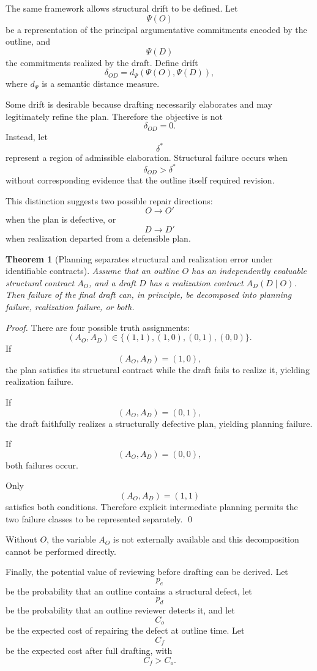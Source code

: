\documentclass[11pt]{article}
\newtheorem{theorem}[definition]{Theorem}
\begin{document}
The same framework allows structural drift to be defined. Let
\[
    \Psi(O)
\]
be a representation of the principal argumentative commitments encoded by the outline, and
\[
    \Psi(D)
\]
the commitments realized by the draft. Define drift
\[
    \delta_{OD}
    =
    d_\Psi(\Psi(O),\Psi(D)),
\]
where \(d_\Psi\) is a semantic distance measure.

Some drift is desirable because drafting necessarily elaborates and may legitimately refine the plan. Therefore the objective is not
\[
    \delta_{OD}=0.
\]
Instead, let
\[
    \delta^\ast
\]
represent a region of admissible elaboration. Structural failure occurs when
\[
    \delta_{OD}>\delta^\ast
\]
without corresponding evidence that the outline itself required revision.

This distinction suggests two possible repair directions:
\[
    O\rightarrow O'
\]
when the plan is defective, or
\[
    D\rightarrow D'
\]
when realization departed from a defensible plan.

\begin{theorem}[Planning separates structural and realization error under identifiable contracts]
Assume that an outline \(O\) has an independently evaluable structural contract \(A_O\), and a draft \(D\) has a realization contract \(A_D(D\mid O)\). Then failure of the final draft can, in principle, be decomposed into planning failure, realization failure, or both.
\end{theorem}

\begin{proof}
There are four possible truth assignments:
\[
    (A_O,A_D)
    \in
    \{(1,1),(1,0),(0,1),(0,0)\}.
\]
If
\[
    (A_O,A_D)=(1,0),
\]
the plan satisfies its structural contract while the draft fails to realize it, yielding realization failure.

If
\[
    (A_O,A_D)=(0,1),
\]
the draft faithfully realizes a structurally defective plan, yielding planning failure.

If
\[
    (A_O,A_D)=(0,0),
\]
both failures occur.

Only
\[
    (A_O,A_D)=(1,1)
\]
satisfies both conditions. Therefore explicit intermediate planning permits the two failure classes to be represented separately. \qed
\end{proof}

Without \(O\), the variable \(A_O\) is not externally available and this decomposition cannot be performed directly.

Finally, the potential value of reviewing before drafting can be derived. Let
\[
    p_e
\]
be the probability that an outline contains a structural defect, let
\[
    p_d
\]
be the probability that an outline reviewer detects it, and let
\[
    C_o
\]
be the expected cost of repairing the defect at outline time. Let
\[
    C_f
\]
be the expected cost after full drafting, with
\[
    C_f>C_o.
\]
\end{document}

